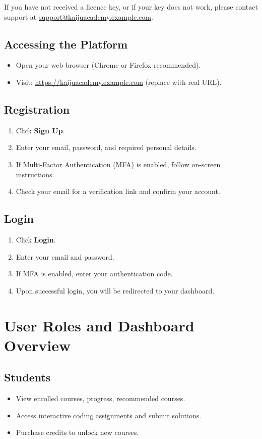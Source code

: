 \documentclass[a4paper,11pt]{scrartcl}
\begin{document}
If you have not received a licence key, or if your key does not work, please contact support at \href{mailto:support@kaijuacademy.example.com}{support@kaijuacademy.example.com}.

\subsection{Accessing the Platform}
\begin{itemize}[leftmargin=*]
    \item Open your web browser (Chrome or Firefox recommended).
    \item Visit: \url{https://kaijuacademy.example.com} (replace with real URL).
\end{itemize}

\subsection{Registration}
\begin{enumerate}[leftmargin=*]
    \item Click \textbf{Sign Up}.
    \item Enter your email, password, and required personal details.
    \item If Multi-Factor Authentication (MFA) is enabled, follow on-screen instructions.
    \item Check your email for a verification link and confirm your account.
\end{enumerate}

\subsection{Login}
\begin{enumerate}[leftmargin=*]
    \item Click \textbf{Login}.
    \item Enter your email and password.
    \item If MFA is enabled, enter your authentication code.
    \item Upon successful login, you will be redirected to your dashboard.
\end{enumerate}

\section{User Roles and Dashboard Overview}

\subsection{Students}
\begin{itemize}[leftmargin=*]
    \item View enrolled courses, progress, recommended courses.
    \item Access interactive coding assignments and submit solutions.
    \item Purchase credits to unlock new courses.
\end{itemize}
\end{document}
